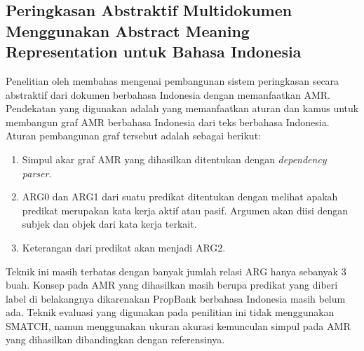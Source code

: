 \subsection{Peringkasan Abstraktif Multidokumen Menggunakan Abstract Meaning Representation untuk Bahasa Indonesia }

Penelitian oleh  membahas mengenai pembangunan sistem peringkasan secara abstraktif dari dokumen berbahasa Indonesia dengan memanfaatkan AMR.
Pendekatan yang digunakan adalah \amrparsing{} yang memanfaatkan aturan dan kamus untuk membangun graf AMR berbahasa Indonesia dari teks berbahasa Indonesia.
Aturan pembangunan graf tersebut adalah sebagai berikut:
\begin{enumerate}
  \item Simpul akar graf AMR yang dihasilkan ditentukan dengan \textit{dependency parser}.
  \item ARG0 dan ARG1 dari suatu predikat ditentukan dengan melihat apakah predikat merupakan kata kerja aktif atau pasif.
  Argumen akan diisi dengan subjek dan objek dari kata kerja terkait.
  \item Keterangan dari predikat akan menjadi ARG2.
\end{enumerate}

Teknik \amrparsing{} ini masih terbatas dengan banyak jumlah relasi ARG hanya sebanyak 3 buah.
Konsep pada \gls{AMR} yang dihasilkan masih berupa predikat yang diberi label  di belakangnya dikarenakan PropBank berbahasa Indonesia masih belum ada.
Teknik evaluasi yang digunakan pada penilitian ini tidak menggunakan \gls{SMATCH}, namun menggunakan ukuran akurasi kemunculan simpul pada \gls{AMR} yang dihasilkan dibandingkan dengan referensinya.
